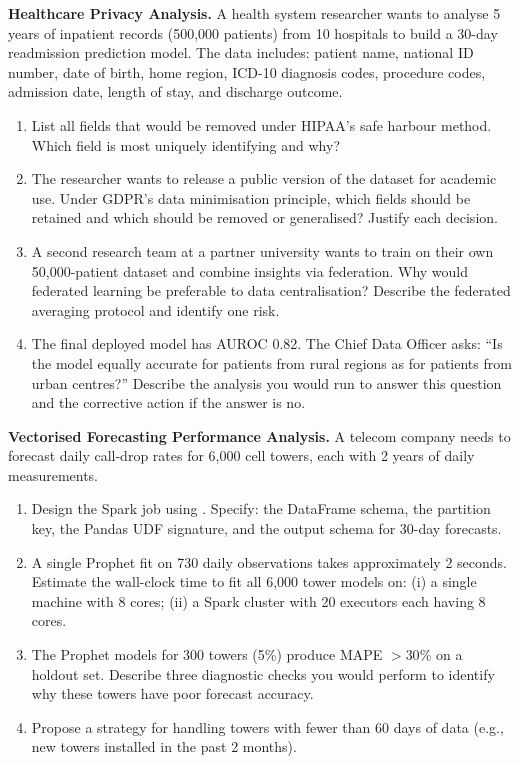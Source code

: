 \ap \textbf{Healthcare Privacy Analysis.}
A health system researcher wants to analyse 5 years of inpatient records
(500{,}000 patients) from 10 hospitals to build a 30-day readmission
prediction model. The data includes: patient name, national ID number,
date of birth, home region, ICD-10 diagnosis codes, procedure codes,
admission date, length of stay, and discharge outcome.
\begin{enumerate}[label=(\alph*)]
  \item List all fields that would be removed under HIPAA's safe harbour
        method. Which field is most uniquely identifying and why?
  \item The researcher wants to release a public version of the dataset
        for academic use. Under GDPR's data minimisation principle, which
        fields should be retained and which should be removed or generalised?
        Justify each decision.
  \item A second research team at a partner university wants to train on
        their own 50{,}000-patient dataset and combine insights via
        federation. Why would federated learning be preferable to data
        centralisation? Describe the federated averaging protocol and
        identify one risk.
  \item The final deployed model has AUROC 0.82. The Chief Data Officer
        asks: ``Is the model equally accurate for patients from rural
        regions as for patients from urban centres?'' Describe the
        analysis you would run to answer this question and the corrective
        action if the answer is no.
\end{enumerate}

\ap \textbf{Vectorised Forecasting Performance Analysis.}
A telecom company needs to forecast daily call-drop rates for 6{,}000
cell towers, each with 2 years of daily measurements.
\begin{enumerate}[label=(\alph*)]
  \item Design the Spark job using . Specify:
        the DataFrame schema, the partition key, the Pandas UDF signature,
        and the output schema for 30-day forecasts.
  \item A single Prophet fit on 730 daily observations takes approximately
        2 seconds. Estimate the wall-clock time to fit all 6{,}000 tower
        models on: (i) a single machine with 8 cores; (ii) a Spark cluster
        with 20 executors each having 8 cores.
  \item The Prophet models for 300 towers (5\%) produce MAPE $> 30\%$
        on a holdout set. Describe three diagnostic checks you would
        perform to identify why these towers have poor forecast accuracy.
  \item Propose a strategy for handling towers with fewer than 60 days
        of data (e.g., new towers installed in the past 2 months).
\end{enumerate}

